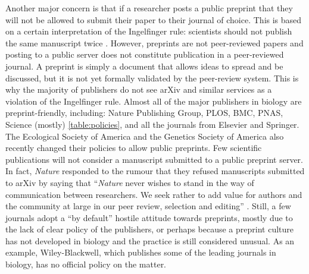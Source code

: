 \documentclass[letterpaper,twocolumn,superscriptaddress,showkeys,longbibliography]{revtex4-1}
\begin{document}
Another major concern is that if a researcher posts a public preprint that they
will not be allowed to submit their paper to their journal of choice. This is
based on a certain interpretation of the Ingelfinger rule: scientists should not
publish the same manuscript twice \cite{alt96}. However, preprints are not
peer-reviewed papers and posting to a public server does not constitute
publication in a peer-reviewed journal.  A preprint is simply a document that
allows ideas to spread and be discussed, but it is not yet formally validated by
the peer-review system. This is why the majority of publishers do not see arXiv
and similar services as a violation of the Ingelfinger rule. Almost all of the
major publishers in biology are preprint-friendly, including: Nature Publishing
Group, PLOS, BMC, PNAS, Science (mostly) \ref{table:policies}, and all the
journals from Elsevier and Springer.  The Ecological Society of America and the
Genetics Society of America also recently changed their policies to allow public
preprints.  Few scientific publications will not consider a manuscript submitted
to a public preprint server. In fact, \emph{Nature} responded to the rumour that
they refused manuscripts submitted to arXiv by saying that ``\emph{Nature} never
wishes to stand in the way of communication between researchers. We seek rather
to add value for authors and the community at large in our peer review,
selection and editing'' \cite{nat05}. Still, a few journals adopt a ``by
default'' hostile attitude towards preprints, mostly due to the lack of clear
policy of the publishers, or perhaps because a preprint culture has not
developed in biology and the practice is still considered unusual. As an
example, Wiley-Blackwell, which publishes some of the leading journals in
biology, has no official policy on the matter.
\end{document}
